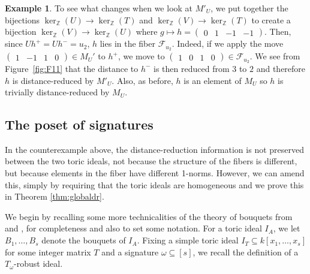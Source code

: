 \documentclass[a4paper, 12pt]{article}
\newcommand{\QQ}{\mathbb Q}
\newcommand{\ZZ}{\mathbb Z}
\theoremstyle{plain}
\theoremstyle{definition}
\newtheorem{example}[theorem]{Example}
\theoremstyle{remark}
\begin{document}
\begin{example}
To see what changes when we look at $M'_U$, we put together the bijections $\ker_\ZZ(U) \rightarrow \ker_\ZZ(T)$ and $\ker_\ZZ(V) \rightarrow \ker_\ZZ(T)$ to create a bijection $\ker_\ZZ(V) \rightarrow \ker_\ZZ(U)$ where $g \mapsto h=\begin{pmatrix} 0&1&-1&-1\end{pmatrix}$. Then, since $U h^+=U h^-=u_2$, $h$ lies in the fiber $\mathcal{F}_{u_2}$.
Indeed, if we apply the move $\begin{pmatrix}1&-1&1&0\end{pmatrix} \in M_U'$ to $h^+$, we move to $\begin{pmatrix}1&0&1&0\end{pmatrix} \in \mathcal{F}_{u_2}$. We see from Figure~\ref{fig:F11} that the distance to $h^-$ is then reduced from $3$ to $2$ and therefore $h$ is distance-reduced by $M'_U$. Also, as before, $h$ is an element of $M_U$ so $h$ is trivially distance-reduced by $M_U$.
\end{example}


\subsection{The poset of signatures} \label{sec:poset of signatures}

In the counterexample above, the distance-reduction information is not preserved between the two toric ideals, not because the structure of the fibers is different, but because elements in the fiber have different 1-norms. However, we can amend this, simply by requiring that the toric ideals are homogeneous and we prove this in Theorem \ref{thm:globaldr}.

We begin by recalling some more technicalities of the theory of bouquets from \cite{petrovic2018bouquet} and \cite{kosta2023strongly}, for completeness and also to set some notation. For a toric ideal $I_A$, we let $B_1,\dots,B_s$ denote the bouquets of $I_A$. Fixing a simple toric ideal $I_T \subseteq k[x_1, \dots ,x_s]$ for some integer matrix $T$ and a signature $\omega \subseteq [s]$, we recall the definition of a $T_{\omega}$-robust ideal. 
\end{document}
